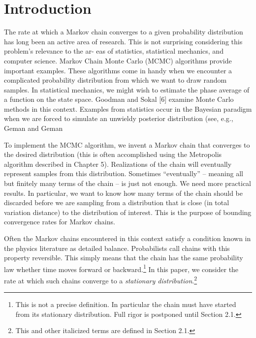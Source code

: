 \documentclass{au}
\numberwithin{equation}{section}
\theoremstyle{plain}
\theoremstyle{definition}
\newcommand{\<}{\ensuremath{\langle}}
\renewcommand{\>}{\ensuremath{\rangle}}
\begin{document}
\maketitle

\chapter{Introduction}
The rate at which a Markov chain converges to a given probability distribution has long
been an active area of research. This is not surprising considering this problem’s relevance to the ar-
eas of statistics, statistical mechanics, and computer science. Markov Chain Monte Carlo (MCMC)
algorithms provide important examples. These algorithms come in handy when we encounter a
complicated probability distribution from which we want to draw random samples. In statistical
mechanics, we might wish to estimate the phase average of a function on the state space. Goodman
and Sokal [6] examine Monte Carlo methods in this context. Examples from statistics occur in the
Bayesian paradigm when we are forced to simulate an unwieldy posterior distribution (see, e.g.,
Geman and Geman 

To implement the MCMC algorithm, we invent a Markov chain that converges to the
desired distribution (this is often accomplished using the Metropolis algorithm
described in Chapter 5). Realizations of the chain will eventually represent
samples from this distribution. Sometimes ``eventually'' -- meaning all but
finitely many terms of the chain -- is just not enough. We need more practical
results. In particular, we want to know how many terms of the chain should be 
discarded before we are sampling from a distribution that is close (in total variation distance) to
the distribution of interest. This is the purpose of bounding convergence rates for Markov chains.

Often the Markov chains encountered in this context satisfy a condition known in the
physics literature as detailed balance. Probabilists call chains with this property reversible. This
simply means that the chain has the same probability law whether time moves
forward or 
backward.\footnote{This is not a precise definition. In particular the chain must
  have started from its stationary distribution. Full rigor is postponed until Section 2.1.}
In this paper, we consider the rate at which such chains converge to a \emph{stationary distribution}.\footnote{This and other italicized terms are defined in Section 2.1.}
\end{document}
